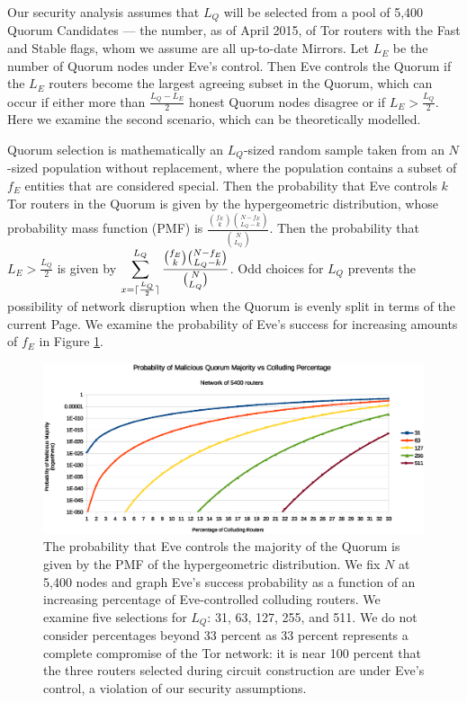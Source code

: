 Our security analysis assumes that $ L_{Q} $ will be selected from a pool of 5,400 Quorum Candidates --- the number, as of April 2015, of Tor routers with the Fast and Stable flags, whom we assume are all up-to-date Mirrors. Let $ L_{E} $ be the number of Quorum nodes under Eve's control. Then Eve controls the Quorum if the $ L_{E} $ routers become the largest agreeing subset in the Quorum, which can occur if either more than $ \frac{L_{Q} - L_{E}}{2} $ honest Quorum nodes disagree or if $ L_{E} > \frac{L_{Q}}{2} $. Here we examine the second scenario, which can be theoretically modelled.

Quorum selection is mathematically an $ L_{Q} $-sized random sample taken from an $ N $-sized population without replacement, where the population contains a subset of $ f_{E} $ entities that are considered special. Then the probability that Eve controls $ k $ Tor routers in the Quorum is given by the hypergeometric distribution, whose probability mass function (PMF) is $ \frac{\binom{f_{E}}{k}\binom{N - f_{E}}{L_{Q} - k}}{\binom{N}{L_{Q}}} $. Then the probability that $ L_{E} > \frac{L_{Q}}{2} $ is given by $ \displaystyle\sum_{x=\lceil\frac{L_{Q}}{2}\rceil}^{L_{Q}} \frac{\binom{f_{E}}{k}\binom{N - f_{E}}{L_{Q} - k}}{\binom{N}{L_{Q}}} $. Odd choices for $ L_{Q} $ prevents the possibility of network disruption when the Quorum is evenly split in terms of the current Page. We examine the probability of Eve's success for increasing amounts of $ f_{E} $ in Figure \ref{chart:quorumMajority}.

\begin{figure}[htbp]
	\centering
	\includegraphics[width=1\textwidth]{analysis/MaliciousQuorumProbability.eps}
	\caption{The probability that Eve controls the majority of the Quorum is given by the PMF of the hypergeometric distribution. We fix $ N $ at 5,400 nodes and graph Eve's success probability as a function of an increasing percentage of Eve-controlled colluding routers. We examine five selections for $ L_{Q} $: 31, 63, 127, 255, and 511. We do not consider percentages beyond 33 percent as 33 percent represents a complete compromise of the Tor network: it is near 100 percent that the three routers selected during circuit construction are under Eve's control, a violation of our security assumptions.}
	\label{chart:quorumMajority}
\end{figure}

